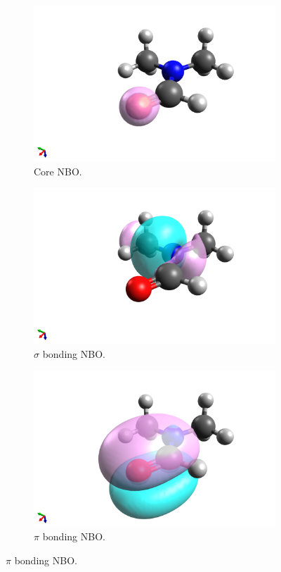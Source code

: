 \begin{refsection}
\begin{figure}
    \centering
    \begin{subfigure}{0.3\linewidth}
        \includegraphics[width=\linewidth]{Figures/dmfnbo-core.png}
        \caption{Core NBO.}
    \end{subfigure}
    \begin{subfigure}{0.3\linewidth}
        \includegraphics[width=\linewidth]{Figures/dmfnbo-sigma.png}
        \caption{$\sigma$ bonding NBO.}
    \end{subfigure}
    \begin{subfigure}{0.3\linewidth}
        \includegraphics[width=\linewidth]{Figures/dmfnbo-pi.png}
        \caption{$\pi$ bonding NBO.}
    \end{subfigure}


\end{figure}
\end{refsection}
